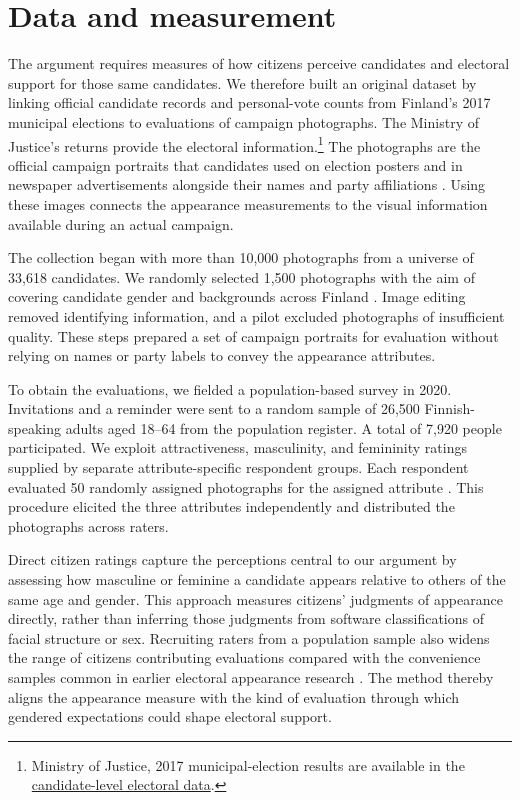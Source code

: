 \documentclass[11pt,a4paper]{article}\usepackage[]{graphicx}\usepackage[]{xcolor}
\begin{document}
\section{Data and measurement}
\label{sec:data}
The argument requires measures of how citizens perceive candidates and electoral support for those same candidates. We therefore built an original dataset by linking official candidate records and personal-vote counts from Finland's 2017 municipal elections to evaluations of campaign photographs. The Ministry of Justice's returns provide the electoral information.\footnote{Ministry of Justice, 2017 municipal-election results are available in the \href{https://tulospalvelu.vaalit.fi/KV-2017/fi/ladattavat_tiedostot.html}{candidate-level electoral data}.} The photographs are the official campaign portraits that candidates used on election posters and in newspaper advertisements alongside their names and party affiliations \parencite{Bahamonde2024,BerggrenEtAl2010,BerggrenEtAl2017}. Using these images connects the appearance measurements to the visual information available during an actual campaign.

The collection began with more than 10,000 photographs from a universe of 33,618 candidates. We randomly selected 1,500 photographs with the aim of covering candidate gender and backgrounds across Finland \parencite{Bahamonde2024}. Image editing removed identifying information, and a pilot excluded photographs of insufficient quality. These steps prepared a set of campaign portraits for evaluation without relying on names or party labels to convey the appearance attributes.

To obtain the evaluations, we fielded a population-based survey in 2020. Invitations and a reminder were sent to a random sample of 26,500 Finnish-speaking adults aged 18--64 from the population register. A total of 7,920 people participated. We exploit attractiveness, masculinity, and femininity ratings supplied by separate attribute-specific respondent groups. Each respondent evaluated 50 randomly assigned photographs for the assigned attribute \parencite{Bahamonde2024}. This procedure elicited the three attributes independently and distributed the photographs across raters.

Direct citizen ratings capture the perceptions central to our argument by assessing how masculine or feminine a candidate appears relative to others of the same age and gender. This approach measures citizens' judgments of appearance directly, rather than inferring those judgments from software classifications of facial structure or sex. Recruiting raters from a population sample also widens the range of citizens contributing evaluations compared with the convenience samples common in earlier electoral appearance research \parencite{Mattes2010,Rosar2008,WiggintonStockemer2021,Bahamonde2024}. The method thereby aligns the appearance measure with the kind of evaluation through which gendered expectations could shape electoral support.
\end{document}
